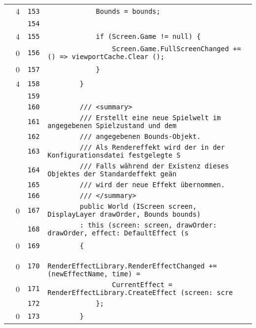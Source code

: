 \documentclass[a4paper,10pt]{article}
\begin{document}
\begin{longtable}[l]{lrrl}
\cellcolor{green} & 4 & \verb~153~ & \verb~            Bounds = bounds;~\\
\cellcolor{gray} &  & \verb~154~ & \verb~~\\
\cellcolor{green} & 4 & \verb~155~ & \verb~            if (Screen.Game != null) {~\\
\cellcolor{red} & 0 & \verb~156~ & \verb~                Screen.Game.FullScreenChanged += () => viewportCache.Clear ();~\\
\cellcolor{red} & 0 & \verb~157~ & \verb~            }~\\
\cellcolor{green} & 4 & \verb~158~ & \verb~        }~\\
\cellcolor{gray} &  & \verb~159~ & \verb~~\\
\cellcolor{gray} &  & \verb~160~ & \verb~        /// <summary>~\\
\cellcolor{gray} &  & \verb~161~ & \verb~        /// Erstellt eine neue Spielwelt im angegebenen Spielzustand und dem~\\
\cellcolor{gray} &  & \verb~162~ & \verb~        /// angegebenen Bounds-Objekt.~\\
\cellcolor{gray} &  & \verb~163~ & \verb~        /// Als Rendereffekt wird der in der Konfigurationsdatei festgelegte S~\\
\cellcolor{gray} &  & \verb~164~ & \verb~        /// Falls während der Existenz dieses Objektes der Standardeffekt geän~\\
\cellcolor{gray} &  & \verb~165~ & \verb~        /// wird der neue Effekt übernommen.~\\
\cellcolor{gray} &  & \verb~166~ & \verb~        /// </summary>~\\
\cellcolor{red} & 0 & \verb~167~ & \verb~        public World (IScreen screen, DisplayLayer drawOrder, Bounds bounds)~\\
\cellcolor{gray} &  & \verb~168~ & \verb~        : this (screen: screen, drawOrder: drawOrder, effect: DefaultEffect (s~\\
\cellcolor{red} & 0 & \verb~169~ & \verb~        {~\\
\cellcolor{red} & 0 & \verb~170~ & \verb~            RenderEffectLibrary.RenderEffectChanged += (newEffectName, time) =~\\
\cellcolor{red} & 0 & \verb~171~ & \verb~                CurrentEffect = RenderEffectLibrary.CreateEffect (screen: scre~\\
\cellcolor{gray} &  & \verb~172~ & \verb~            };~\\
\cellcolor{red} & 0 & \verb~173~ & \verb~        }~\\

\end{longtable}
\end{document}
